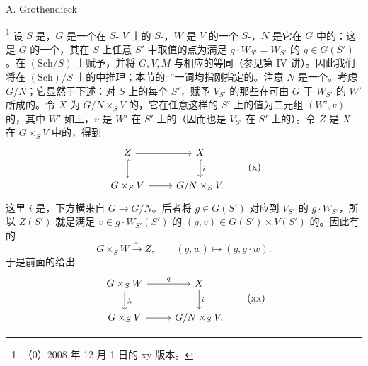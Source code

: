 \begin{center}A. Grothendieck\end{center}
\footnote{（0）2008 年 12 月 1 日的 xy 版本。}
设 $S$ 是，$G$ 是一个在 $S$- $V$ 上的 $S$-，$W$ 是 $V$ 的一个 $S$-，$N$ 是它在 $G$ 中的：这是 $G$ 的一个，其在 $S$ 上任意 $S'$ 中取值的点为满足 $g\cdot W_{S'}=W_{S'}$ 的 $g\in G(S')$。在 $(\mathrm{Sch}/S)$ 上赋予，并将 $G,V,M$ 与相应的等同（参见第 IV 讲）。因此我们将在 $(\mathrm{Sch})/S$ 上的中推理；本节的“”一词均指刚指定的。注意 $N$ 是一个。考虑 $G/N$；它显然于下述：对 $S$ 上的每个 $S'$，赋予 $V_{S'}$ 的那些在可由 $G$ 于 $W_{S'}$ 的 $W'$ 所成的。令 $X$ 为 $G/N\times_S V$ 的，它在任意这样的 $S'$ 上的值为二元组 $(W',v)$ 的，其中 $W'$ 如上，$v$ 是 $W'$ 在 $S'$ 上的（因而也是 $V_{S'}$ 在 $S'$ 上的）。令 $Z$ 是 $X$ 在 $G\times_S V$ 中的，得到
\[
\begin{tikzcd}
Z \arrow[r]\arrow[d,hook] &X\arrow[d,hook,"i"]\\
G\times_S V\arrow[r]&G/N\times_S V.
\end{tikzcd}\tag{x}
\]
这里 $i$ 是，下方横来自 $G\to G/N$。后者将 $g\in G(S')$ 对应到 $V_{S'}$ 的 $g\cdot W_{S'}$，所以 $Z(S')$ 就是满足 $v\in g\cdot W_{S'}(S')$ 的 $(g,v)\in G(S')\times V(S')$ 的。因此有的
\[G\times_S W\xrightarrow{\sim}Z,\qquad(g,w)\longmapsto(g,g\cdot w).
\]
于是前面的给出
\[
\begin{tikzcd}
G\times_S W\arrow[r,"q"]\arrow[d,"\lambda"]&X\arrow[d,"i"]\\
G\times_S V\arrow[r]&G/N\times_S V,
\end{tikzcd}\tag{xx}
\]
